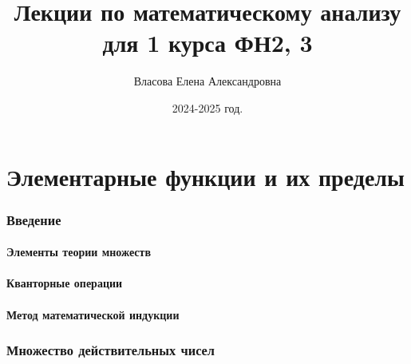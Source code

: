 \documentclass[a4paper,12pt]{article} %
\author{Власова Елена Александровна}
\title{Лекции по математическому анализу для 1 курса ФН2, 3}
\date{2024-2025 год.}
\begin{document}

\maketitle

\newpage
\tableofcontents
\newpage

\part*{Элементарные функции и их пределы}

\section{Введение}
\subsection{Элементы теории множеств}
\subsection{Кванторные операции}
\subsection{Метод математической индукции}

\section{Множество действительных чисел}
\end{document}
